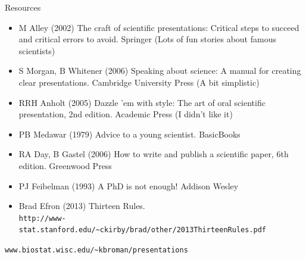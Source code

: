 \documentclass[12pt]{article}
\newcommand{\headsize}{\fontsize{35}{35} \selectfont}
\newcommand{\smallersize}{\fontsize{20}{25} \selectfont}
\newcommand{\smallestsize}{\fontsize{18}{22} \selectfont}
\begin{document}
\newpage

\headsize \color{myyellow}
\hfill \begin{minipage}{5.75in}
\centering
Resources
\end{minipage}

\vspace{15mm} \color{mywhite} \smallersize

\hfill \begin{minipage}{10in}

\begin{itemize}
\setlength{\rightskip}{0pt plus 1fil} %
\itemsep12pt
\item M Alley (2002) The craft of scientific presentations: Critical
  steps to succeed and critical errors to avoid.  Springer
{\color{myblue} \smallestsize (Lots of fun stories about famous scientists)}


\item S Morgan, B Whitener (2006) Speaking about science: A manual for
  creating clear presentations.  Cambridge University Press 
{\color{myblue} \smallestsize (A bit simplistic)}

\item RRH Anholt (2005) Dazzle 'em with style: The art of oral
  scientific presentation, 2nd edition.  Academic Press 
{\color{myblue} \smallestsize (I didn't like it)}

\item PB Medawar (1979) Advice to a young scientist.  BasicBooks

\item RA Day, B Gastel (2006) How to write and publish a scientific
  paper, 6th edition.  Greenwood Press


\item PJ Feibelman (1993) A PhD is not enough!  Addison Wesley

\item Brad Efron (2013) Thirteen Rules. \\
{\color{myblue} \smallestsize \verb|http://www-stat.stanford.edu/~ckirby/brad/other/2013ThirteenRules.pdf|}

\end{itemize}
\end{minipage}

\vfill

\hfill
{\color{myblue} \smallestsize
\verb|www.biostat.wisc.edu/~kbroman/presentations|}

\vspace{5mm}
\end{document}
